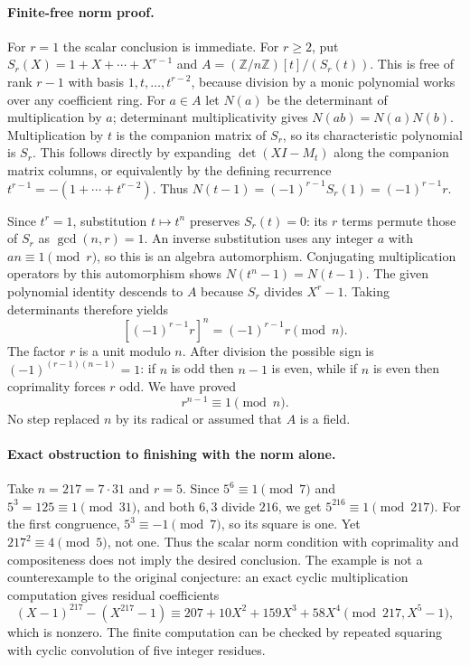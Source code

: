 \documentclass[11pt]{article}
\begin{document}
\paragraph{Finite-free norm proof.}
For $r=1$ the scalar conclusion is immediate. For $r\ge2$, put
$S_r(X)=1+X+\cdots+X^{r-1}$ and
$A=(\mathbb Z/n\mathbb Z)[t]/(S_r(t))$.
This is free of rank $r-1$ with basis $1,t,\ldots,t^{r-2}$,
because division by a monic polynomial works over any coefficient ring.
For $a\in A$ let $N(a)$ be the determinant of multiplication by $a$;
determinant multiplicativity gives $N(ab)=N(a)N(b)$.
Multiplication by $t$ is the companion matrix of $S_r$, so its
characteristic polynomial is $S_r$. This follows directly by expanding
$\det(XI-M_t)$ along the companion matrix columns, or equivalently
by the defining recurrence $t^{r-1}=-(1+\cdots+t^{r-2})$.
Thus $N(t-1)=(-1)^{r-1}S_r(1)=(-1)^{r-1}r$.

Since $t^r=1$, substitution $t\mapsto t^n$ preserves $S_r(t)=0$:
its $r$ terms permute those of $S_r$ as $\gcd(n,r)=1$.
An inverse substitution uses any integer $a$ with $an\equiv1\pmod r$,
so this is an algebra automorphism. Conjugating multiplication operators
by this automorphism shows $N(t^n-1)=N(t-1)$.
The given polynomial identity descends to $A$ because $S_r$ divides
$X^r-1$. Taking determinants therefore yields
\[
[(-1)^{r-1}r]^n=(-1)^{r-1}r\pmod n.
\]
The factor $r$ is a unit modulo $n$. After division the possible sign
is $(-1)^{(r-1)(n-1)}=1$: if $n$ is odd then $n-1$ is even, while
if $n$ is even then coprimality forces $r$ odd. We have proved
\[
r^{n-1}\equiv1\pmod n.
\]
No step replaced $n$ by its radical or assumed that $A$ is a field.

\paragraph{Exact obstruction to finishing with the norm alone.}
Take $n=217=7\cdot31$ and $r=5$. Since $5^6\equiv1\pmod7$
and $5^3=125\equiv1\pmod{31}$, and both $6,3$ divide $216$,
we get $5^{216}\equiv1\pmod{217}$. For the first congruence,
$5^3\equiv-1\pmod7$, so its square is one.
Yet $217^2\equiv4\pmod5$, not one. Thus the scalar norm condition
with coprimality and compositeness does not imply the desired conclusion.
The example is not a counterexample to the original conjecture:
an exact cyclic multiplication computation gives residual coefficients
\[
(X-1)^{217}-(X^{217}-1)
 \equiv207+10X^2+159X^3+58X^4\pmod{217,X^5-1},
\]
which is nonzero. The finite computation can be checked by repeated
squaring with cyclic convolution of five integer residues.
\end{document}
